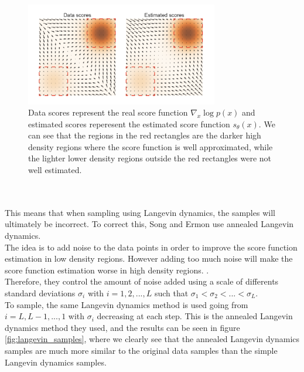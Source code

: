 \documentclass[twoside]{article}
\numberwithin{equation}{section}
\numberwithin{figure}{section}
\begin{document}
\begin{figure}[h]
  \begin{center}
    \includegraphics[width= 0.75\textwidth]{images/highlowdensity.png}
    \caption{Data scores represent the real score function $\nabla_x \log p(x)$ and estimated scores reperesent the estimated score function $s_\theta (x)$. We can see that the regions in the red rectangles are the darker high density regions where the score function is well approximated, while the lighter lower density regions outside the red rectangles were not well estimated. \cite{song2020generative}}
    \label{fig:scores}
  \end{center}
\end{figure}
\\\\
This means that when sampling using Langevin dynamics, the samples will ultimately be incorrect. \cite{song2020generative} 
To correct this, Song and Ermon \cite{song2020generative} use annealed Langevin dynamics. \\
The idea is to add noise to the data points in order to improve the score function estimation in low density regions. \cite{songblog} However adding too much noise will make the score function estimation worse in high density regions. \cite{songblog}. \\
Therefore, they control the amount of noise added using a scale of differents standard deviations $\sigma_i$ with $i = 1, 2, ..., L$ such that $\sigma_1 < \sigma_2 < ... < \sigma_L$. \cite{songblog,song2020generative} \\
To sample, the same Langevin dynamics method is used going from $i = L, L-1, ..., 1$ with $\sigma_i$ decreasing at each step. This is the annealed Langevin dynamics method they used, and the results can be seen in figure \ref{fig:langevin_samples}, where we clearly see that the annealed Langevin dynamics samples are much more similar to the original data samples than the simple Langevin dynamics samples. \cite{songblog, song2020generative} \\ 
\end{document}
